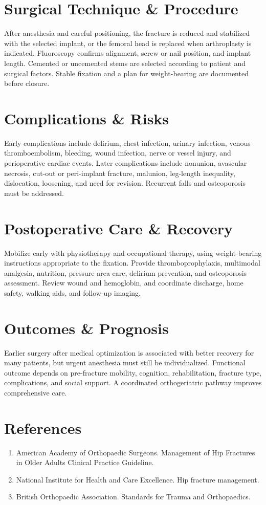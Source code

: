 \section*{Surgical Technique \& Procedure}
After anesthesia and careful positioning, the fracture is reduced and stabilized with the selected implant, or the femoral head is replaced when arthroplasty is indicated. Fluoroscopy confirms alignment, screw or nail position, and implant length. Cemented or uncemented stems are selected according to patient and surgical factors. Stable fixation and a plan for weight-bearing are documented before closure.

\section*{Complications \& Risks}
Early complications include delirium, chest infection, urinary infection, venous thromboembolism, bleeding, wound infection, nerve or vessel injury, and perioperative cardiac events. Later complications include nonunion, avascular necrosis, cut-out or peri-implant fracture, malunion, leg-length inequality, dislocation, loosening, and need for revision. Recurrent falls and osteoporosis must be addressed.

\section*{Postoperative Care \& Recovery}
Mobilize early with physiotherapy and occupational therapy, using weight-bearing instructions appropriate to the fixation. Provide thromboprophylaxis, multimodal analgesia, nutrition, pressure-area care, delirium prevention, and osteoporosis assessment. Review wound and hemoglobin, and coordinate discharge, home safety, walking aids, and follow-up imaging.

\section*{Outcomes \& Prognosis}
Earlier surgery after medical optimization is associated with better recovery for many patients, but urgent anesthesia must still be individualized. Functional outcome depends on pre-fracture mobility, cognition, rehabilitation, fracture type, complications, and social support. A coordinated orthogeriatric pathway improves comprehensive care.

\section*{References}
\begin{enumerate}
\item American Academy of Orthopaedic Surgeons. Management of Hip Fractures in Older Adults Clinical Practice Guideline.
\item National Institute for Health and Care Excellence. Hip fracture management.
\item British Orthopaedic Association. Standards for Trauma and Orthopaedics.
\end{enumerate}
